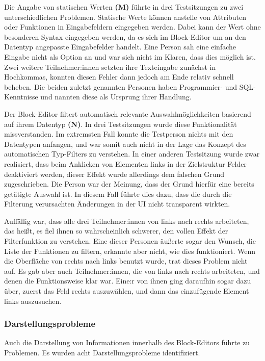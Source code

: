 \pskip
Die Angabe von statischen Werten \textbf{(M)} führte in drei Testsitzungen zu zwei unterschiedlichen Problemen. Statische Werte können anstelle von Attributen oder Funktionen in Eingabefeldern eingegeben werden. Dabei kann der Wert ohne besonderen Syntax eingegeben werden, da es sich im Block-Editor um an den Datentyp angepasste Eingabefelder handelt. Eine Person sah eine einfache Eingabe nicht als Option an und war sich nicht im Klaren, dass dies möglich ist. Zwei weitere Teilnehmer:innen setzten ihre Texteingabe zunächst in Hochkommas, konnten diesen Fehler dann jedoch am Ende relativ schnell beheben. Die beiden zuletzt genannten Personen haben Programmier- und \ac{SQL}-Kenntnisse und nannten diese als Ursprung ihrer Handlung.

\pskip
Der Block-Editor filtert automatisch relevante Auswahlmöglichkeiten basierend auf ihrem Datentyp \textbf{(N)}. In drei Testsitzungen wurde diese Funktionalität missverstanden. Im extremsten Fall konnte die Testperson nichts mit den Datentypen anfangen, und war somit auch nicht in der Lage das Konzept des automatischen Typ-Filters zu verstehen. In einer anderen Testsitzung wurde zwar realisiert, dass beim Anklicken von Elementen links in der Zielstruktur Felder deaktiviert werden, dieser Effekt wurde allerdings dem falschen Grund zugeschrieben. Die Person war der Meinung, dass der Grund hierfür eine bereits getätigte Auswahl ist. In diesem Fall führte dies dazu, dass die durch die Filterung verursachten Änderungen in der UI nicht transparent wirkten.

Auffällig war, dass alle drei Teilnehmer:innen von links nach rechts arbeiteten, das heißt, es fiel ihnen so wahrscheinlich schwerer, den vollen Effekt der Filterfunktion zu verstehen. Eine dieser Personen äußerte sogar den Wunsch, die Liste der Funktionen zu filtern, erkannte aber nicht, wie dies funktioniert. Wenn die Oberfläche von rechts nach links benutzt wurde, trat dieses Problem nicht auf. Es gab aber auch Teilnehmer:innen, die von links nach rechts arbeiteten, und denen die Funktionsweise klar war. Eine:r von ihnen ging daraufhin sogar dazu über, zuerst das Feld rechts auszuwählen, und dann das einzufügende Element links auszusuchen.

\subsubsection{Darstellungsprobleme}

Auch die Darstellung von Informationen innerhalb des Block-Editors führte zu Problemen. Es wurden acht Darstellungsprobleme identifiziert.

